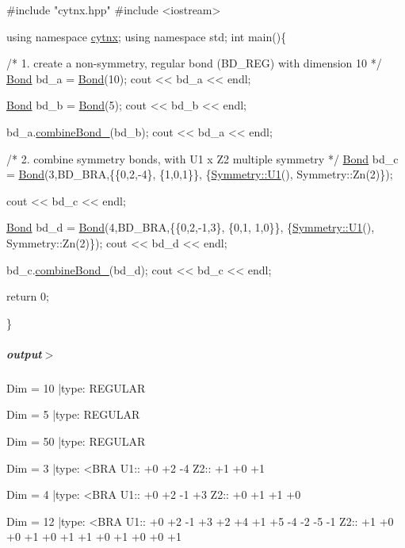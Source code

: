 \begin{DoxyCodeInclude}
\textcolor{preprocessor}{#include "cytnx.hpp"}
\textcolor{preprocessor}{#include <iostream>}


\textcolor{keyword}{using namespace }\hyperlink{namespacecytnx}{cytnx};
\textcolor{keyword}{using namespace }std;
\textcolor{keywordtype}{int} main()\{ 

    \textcolor{comment}{/* 1.}
\textcolor{comment}{        create a non-symmetry, regular bond (BD\_REG) }
\textcolor{comment}{        with dimension 10}
\textcolor{comment}{    */}
    \hyperlink{classcytnx_1_1Bond}{Bond} bd\_a = \hyperlink{classcytnx_1_1Bond}{Bond}(10);
    cout << bd\_a << endl;

    \hyperlink{classcytnx_1_1Bond}{Bond} bd\_b = \hyperlink{classcytnx_1_1Bond}{Bond}(5);
    cout << bd\_b << endl;


    bd\_a.\hyperlink{classcytnx_1_1Bond_ac21ab26ec469ac56ae78c9e4bbbe7040}{combineBond\_}(bd\_b);
    cout << bd\_a << endl;


    \textcolor{comment}{/* 2.}
\textcolor{comment}{        combine symmetry bonds, }
\textcolor{comment}{        with U1 x Z2 multiple symmetry }
\textcolor{comment}{    */}
    \hyperlink{classcytnx_1_1Bond}{Bond} bd\_c = \hyperlink{classcytnx_1_1Bond}{Bond}(3,BD\_BRA,\{\{0,2,-4\},
                               \{1,0,1\}\},
                              \{\hyperlink{classcytnx_1_1Symmetry_a9218fd66fc9cca64cd3d792e0019592a}{Symmetry::U1}(),
                               Symmetry::Zn(2)\});
                                
    cout << bd\_c << endl;

    \hyperlink{classcytnx_1_1Bond}{Bond} bd\_d = \hyperlink{classcytnx_1_1Bond}{Bond}(4,BD\_BRA,\{\{0,2,-1,3\},
                               \{0,1, 1,0\}\},
                              \{\hyperlink{classcytnx_1_1Symmetry_a9218fd66fc9cca64cd3d792e0019592a}{Symmetry::U1}(),
                               Symmetry::Zn(2)\});
    cout << bd\_d << endl;

    
    bd\_c.\hyperlink{classcytnx_1_1Bond_ac21ab26ec469ac56ae78c9e4bbbe7040}{combineBond\_}(bd\_d);
    cout << bd\_c << endl;

    \textcolor{keywordflow}{return} 0;
    


\}

\end{DoxyCodeInclude}
 \subparagraph*{output$>$}


\begin{DoxyVerbInclude}
Dim = 10 |type: REGULAR 

Dim = 5 |type: REGULAR 

Dim = 50 |type: REGULAR 

Dim = 3 |type: <BRA     
 U1::  +0 +2 -4
 Z2::  +1 +0 +1

Dim = 4 |type: <BRA     
 U1::  +0 +2 -1 +3
 Z2::  +0 +1 +1 +0

Dim = 12 |type: <BRA     
 U1::  +0 +2 -1 +3 +2 +4 +1 +5 -4 -2 -5 -1
 Z2::  +1 +0 +0 +1 +0 +1 +1 +0 +1 +0 +0 +1

\end{DoxyVerbInclude}
